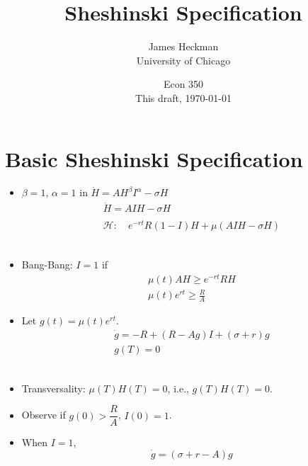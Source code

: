 \documentclass[12pt,compress,handout]{beamer}  %
\begin{document}
\title{Sheshinski Specification}

\author{James Heckman\\University of Chicago}

\date{Econ 350\\
This draft, \today}


\frame{\titlepage}


\section{Basic Sheshinski Specification}
\begin{frame}
\begin{center}
\textbf{\insertsection}
\end{center}
\begin{itemize}[<+->]
\item $\beta =1$, $\alpha =1$ in $\dot{H}=AH^{\beta}I^{\alpha}-\sigma H$
\begin{gather*}
\dot{H}=AIH-\sigma H\\
\\
\mathcal{H}: \quad e^{-rt}R(1-I)H+\mu (AIH-\sigma H)
\end{gather*}
\\[2mm]

\item Bang-Bang: $I = 1$ if
\begin{gather*}
\mu(t) AH\geq e^{-rt}RH \\
\mu(t)e^{rt}\geq \frac{R}{A}
\end{gather*}
\end{itemize}
\end{frame}


\begin{frame}
\begin{itemize}[<+->]
\item Let $g(t)=\mu (t)e^{rt}$.
\begin{gather*}
\dot{g}=-R+(R-Ag)I+(\sigma +r)g \\
g(T)=0
\end{gather*}
\\[2mm]

\item Transversality: $\mu (T)H(T)=0$, i.e., $g(T)H(T)=0$.
\medskip

\item Observe if $g(0)> \dfrac{R}{A}$, $I(0) = 1$.
\\[2mm]

\item When $I=1$,
\begin{equation*}
\dot{g}=(\sigma +r-A)g
\end{equation*}
\end{itemize}
\end{frame}
\end{document}
